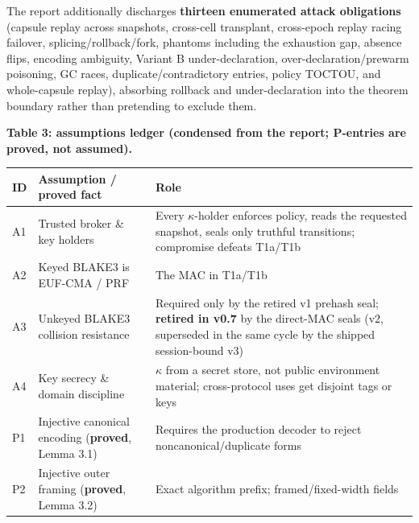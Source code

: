 \documentclass[
  11pt,
]{article}
\newcounter{none} %
\begin{document}
The report additionally discharges \textbf{thirteen enumerated attack obligations} (capsule replay across snapshots, cross-cell transplant, cross-epoch replay racing failover, splicing/rollback/fork, phantoms including the exhaustion gap, absence flips, encoding ambiguity, Variant B under-declaration, over-declaration/prewarm poisoning, GC races, duplicate/contradictory entries, policy TOCTOU, and whole-capsule replay), absorbing rollback and under-declaration into the theorem boundary rather than pretending to exclude them.

\textbf{Table 3: assumptions ledger (condensed from the report; P-entries are proved, not assumed).}

{\def\LTcaptype{none} %
\begin{longtable}[]{@{}
  >{\raggedright\arraybackslash}p{}
  >{\raggedright\arraybackslash}p{}
  >{\raggedright\arraybackslash}p{}@{}}
\toprule\noalign{}
\begin{minipage}[b]{\linewidth}\raggedright
ID
\end{minipage} & \begin{minipage}[b]{\linewidth}\raggedright
Assumption / proved fact
\end{minipage} & \begin{minipage}[b]{\linewidth}\raggedright
Role
\end{minipage} \\
\midrule\noalign{}
\endhead
\bottomrule\noalign{}
\endlastfoot
A1 & Trusted broker \& key holders & Every $\kappa$-holder enforces policy, reads the requested snapshot, seals only truthful transitions; compromise defeats T1a/T1b \\
A2 & Keyed BLAKE3 is EUF-CMA / PRF & The MAC in T1a/T1b \\
A3 & Unkeyed BLAKE3 collision resistance & Required only by the retired v1 prehash seal; \textbf{retired in v0.7} by the direct-MAC seals (v2, superseded in the same cycle by the shipped session-bound v3) \\
A4 & Key secrecy \& domain discipline & $\kappa$ from a secret store, not public environment material; cross-protocol uses get disjoint tags or keys \\
P1 & Injective canonical encoding (\textbf{proved}, Lemma 3.1) & Requires the production decoder to reject noncanonical/duplicate forms \\
P2 & Injective outer framing (\textbf{proved}, Lemma 3.2) & Exact algorithm prefix; framed/fixed-width fields \\

\end{longtable}}
\end{document}
